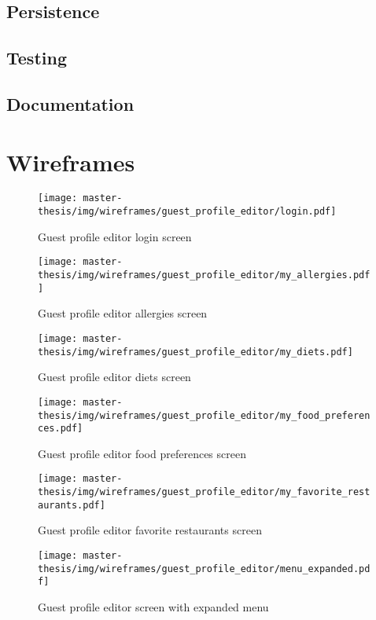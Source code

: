 \subsection{Persistence}

\subsection{Testing}

\subsection{Documentation}

\section{Wireframes}
\begin{figure}[h]
  \centering
  \texttt{[image: master-thesis/img/wireframes/guest\_profile\_editor/login.pdf]}
  \caption{Guest profile editor login screen}
\end{figure}

\begin{figure}[h]
  \centering
  \texttt{[image: master-thesis/img/wireframes/guest\_profile\_editor/my\_allergies.pdf]}
  \caption{Guest profile editor allergies screen}
\end{figure}

\begin{figure}[h]
  \centering
  \texttt{[image: master-thesis/img/wireframes/guest\_profile\_editor/my\_diets.pdf]}
  \caption{Guest profile editor diets screen}
\end{figure}

\begin{figure}[h]
  \centering
  \texttt{[image: master-thesis/img/wireframes/guest\_profile\_editor/my\_food\_preferences.pdf]}
  \caption{Guest profile editor food preferences screen}
\end{figure}

\begin{figure}[h]
  \centering
  \texttt{[image: master-thesis/img/wireframes/guest\_profile\_editor/my\_favorite\_restaurants.pdf]}
  \caption{Guest profile editor favorite restaurants screen}
\end{figure}

\begin{figure}[h]
  \centering
  \texttt{[image: master-thesis/img/wireframes/guest\_profile\_editor/menu\_expanded.pdf]}
  \caption{Guest profile editor screen with expanded menu}
\end{figure}

\listoftodos
